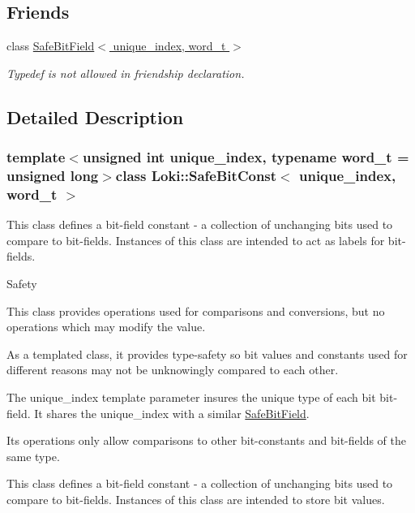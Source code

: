 \subsection*{Friends}
\begin{DoxyCompactItemize}
\item 
\hypertarget{classLoki_1_1SafeBitConst_a14541da61dccc9821659cd1ce5d3dff1}{}class \hyperlink{classLoki_1_1SafeBitConst_a14541da61dccc9821659cd1ce5d3dff1}{Safe\+Bit\+Field$<$ unique\+\_\+index, word\+\_\+t $>$}\label{classLoki_1_1SafeBitConst_a14541da61dccc9821659cd1ce5d3dff1}

\begin{DoxyCompactList}\small\item\em Typedef is not allowed in friendship declaration. \end{DoxyCompactList}\end{DoxyCompactItemize}


\subsection{Detailed Description}
\subsubsection*{template$<$unsigned int unique\+\_\+index, typename word\+\_\+t = unsigned long$>$class Loki\+::\+Safe\+Bit\+Const$<$ unique\+\_\+index, word\+\_\+t $>$}

This class defines a bit-\/field constant -\/ a collection of unchanging bits used to compare to bit-\/fields. Instances of this class are intended to act as labels for bit-\/fields.

\begin{DoxyParagraph}{Safety}

\begin{DoxyItemize}
\item This class provides operations used for comparisons and conversions, but no operations which may modify the value.
\item As a templated class, it provides type-\/safety so bit values and constants used for different reasons may not be unknowingly compared to each other.
\item The unique\+\_\+index template parameter insures the unique type of each bit bit-\/field. It shares the unique\+\_\+index with a similar \hyperlink{classLoki_1_1SafeBitField}{Safe\+Bit\+Field}.
\item Its operations only allow comparisons to other bit-\/constants and bit-\/fields of the same type.
\end{DoxyItemize}
\end{DoxyParagraph}
This class defines a bit-\/field constant -\/ a collection of unchanging bits used to compare to bit-\/fields. Instances of this class are intended to store bit values.

